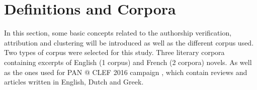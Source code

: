 \chapter{Definitions and Corpora \label{sec:definitions_and_corpora}}

In this section, some basic concepts related to the authorship verification, attribution and clustering will be introduced as well as the different corpus used.
Two types of corpus were selected for this study.
Three literary corpora containing excerpts of English (1 corpus) and French (2 corpora) novels.
As well as the ones used for PAN @ CLEF 2016 campaign \cite{pan16}, which contain reviews and articles written in English, Dutch and Greek.








